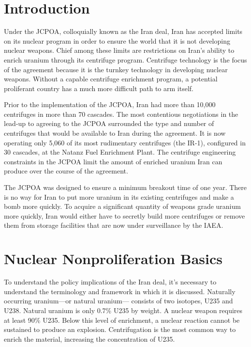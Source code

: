 \section{Introduction}
\label{s_intro}
Under the \gls{JCPOA}, colloquially known as the Iran deal, Iran has accepted limits on its nuclear program in order to ensure the world that it is not developing nuclear weapons. Chief among these limits are restrictions on Iran’s ability to enrich uranium through its centrifuge program. Centrifuge technology is the focus of the agreement because it is the turnkey technology in developing nuclear weapons. Without a capable centrifuge enrichment program, a potential proliferant country has a much more difficult path to arm itself.

Prior to the implementation of the \gls{JCPOA}, Iran had more than 10,000 centrifuges in more than 70 cascades. The most contentious negotiations in the lead-up to agreeing to the \gls{JCPOA} surrounded the type and number of centrifuges that would be available to Iran during the agreement. It is now operating only 5,060 of its most rudimentary centrifuges (the IR-1), configured in 30 cascades, at the Natanz Fuel Enrichment Plant. The centrifuge engineering constraints in the \gls{JCPOA} limit the amount of enriched uranium Iran can produce over the course of the agreement.

The \gls{JCPOA} was designed to ensure a minimum breakout time of one year. There is no way for Iran to put more uranium in its existing centrifuges and make a bomb more quickly. To acquire a significant quantity of weapons grade uranium more quickly, Iran would either have to secretly build more centrifuges or remove them from storage facilities that are now under surveillance by the \gls{IAEA}.


\section{Nuclear Nonproliferation Basics}
To understand the policy implications of the Iran deal, it’s necessary to understand the terminology and framework in which it is discussed. Naturally occurring uranium—or natural uranium— consists of two isotopes, \gls{U235} and \gls{U238}. Natural uranium is only 0.7\% \gls{U235} by weight. A nuclear weapon requires at least 90\% \gls{U235}. Below this level of enrichment, a nuclear reaction cannot be sustained to produce an explosion.  Centrifugation is the most common way to enrich the material, increasing the concentration of \gls{U235}.

